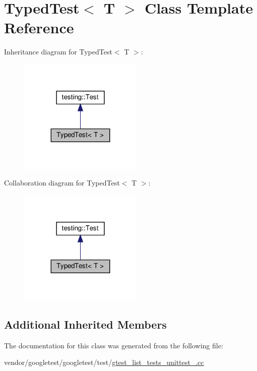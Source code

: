 \hypertarget{class_typed_test}{}\section{Typed\+Test$<$ T $>$ Class Template Reference}
\label{class_typed_test}


Inheritance diagram for Typed\+Test$<$ T $>$\+:
\nopagebreak
\begin{figure}[H]
\begin{center}
\leavevmode
\includegraphics[width=167pt]{class_typed_test__inherit__graph}
\end{center}
\end{figure}


Collaboration diagram for Typed\+Test$<$ T $>$\+:
\nopagebreak
\begin{figure}[H]
\begin{center}
\leavevmode
\includegraphics[width=167pt]{class_typed_test__coll__graph}
\end{center}
\end{figure}
\subsection*{Additional Inherited Members}


The documentation for this class was generated from the following file\+:\begin{DoxyCompactItemize}
\item 
vendor/googletest/googletest/test/\hyperlink{gtest__list__tests__unittest___8cc}{gtest\+\_\+list\+\_\+tests\+\_\+unittest\+\_\+.\+cc}\end{DoxyCompactItemize}
